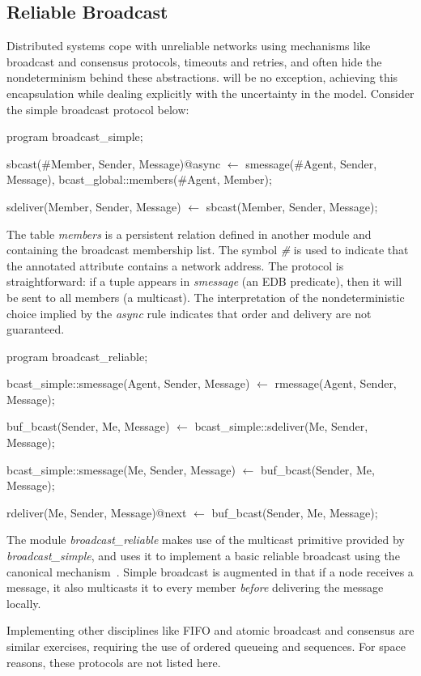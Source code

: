 \subsection{Reliable Broadcast}

Distributed systems cope with unreliable networks using mechanisms like broadcast and consensus protocols, 
timeouts and retries, and often hide the nondeterminism behind these abstractions.  \lang will be no exception,
achieving this encapsulation while dealing explicitly with the uncertainty in the model.  Consider the simple
broadcast protocol below:

\begin{Dedalus}

program broadcast_simple;

sbcast(#Member, Sender, Message)@async \(\leftarrow\)
    smessage(#Agent, Sender, Message),
    bcast_global::members(#Agent, Member);

sdeliver(Member, Sender, Message) \(\leftarrow\)
    sbcast(Member, Sender, Message);

\end{Dedalus}

The table \emph{members} is a persistent relation defined in another module and containing the broadcast 
membership list.  The symbol \emph{\#} is used to indicate that the annotated attribute contains a network
address.  The protocol is straightforward: if a tuple appears in \emph{smessage} (an EDB predicate), then
it will be sent to all members (a multicast).  The interpretation of the nondeterministic choice implied by the
\emph{async} rule indicates that order and delivery are not guaranteed.



\begin{Dedalus}
program broadcast_reliable;

bcast_simple::smessage(Agent, Sender, Message)  \(\leftarrow\)
    rmessage(Agent, Sender, Message);

buf_bcast(Sender, Me, Message)  \(\leftarrow\)
    bcast_simple::sdeliver(Me, Sender, Message);

bcast_simple::smessage(Me, Sender, Message)  \(\leftarrow\)
    buf_bcast(Sender, Me, Message);

rdeliver(Me, Sender, Message)@next  \(\leftarrow\)
    buf_bcast(Sender, Me, Message);

\end{Dedalus}

The module \emph{broadcast\_reliable} makes use of the multicast primitive provided by \emph{broadcast\_simple}, and
uses it to implement a basic reliable broadcast using the canonical mechanism~\cite{mullender}. 
Simple broadcast is augmented in that if a node receives a message, it 
also multicasts it to every member \emph{before} delivering the message locally.  

Implementing other disciplines like FIFO and atomic broadcast and consensus are similar exercises, requiring the use of
ordered queueing and sequences.  For space reasons, these protocols are not listed here.